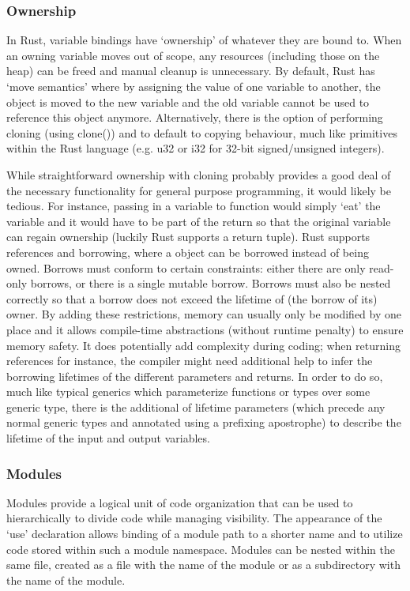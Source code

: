 \subsubsection{Ownership}

In Rust, variable bindings have `ownership' of whatever they are bound to. When an owning variable moves out of scope, any resources (including those on the heap) can be freed and manual cleanup is unnecessary. By default, Rust has `move semantics' where by assigning the value of one variable to another, the object is moved to the new variable and the old variable cannot be used to reference this object anymore. Alternatively, there is the option of performing cloning (using clone()) and to default to copying behaviour, much like primitives within the Rust language (e.g. u32 or i32 for 32-bit signed/unsigned integers).

While straightforward ownership with cloning probably provides a good deal of the necessary functionality for general purpose programming, it would likely be tedious. For instance, passing in a variable to function would simply `eat' the variable and it would have to be part of the return so that the original variable can regain ownership (luckily Rust supports a return tuple). Rust supports references and borrowing, where a object can be borrowed instead of being owned. Borrows must conform to certain constraints: either there are only read-only borrows, or there is a single mutable borrow. Borrows must also be nested correctly so that a borrow does not exceed the lifetime of (the borrow of its) owner. By adding these restrictions, memory can usually only be modified by one place and it allows compile-time abstractions (without runtime penalty) to ensure memory safety. It does potentially add complexity during coding; when returning references for instance, the compiler might need additional help to infer the borrowing lifetimes of the different parameters and returns. In order to do so, much like typical generics which parameterize functions or types over some generic type, there is the additional of lifetime parameters (which precede any normal generic types and annotated using a prefixing apostrophe) to describe the lifetime of the input and output variables.

\subsubsection{Modules}
Modules provide a logical unit of code organization that can be used to hierarchically to divide code while managing visibility. The appearance of the `use' declaration allows binding of a module path to a shorter name and to utilize code stored within such a module namespace. Modules can be nested within the same file, created as a file with the name of the module or as a subdirectory with the name of the module.

